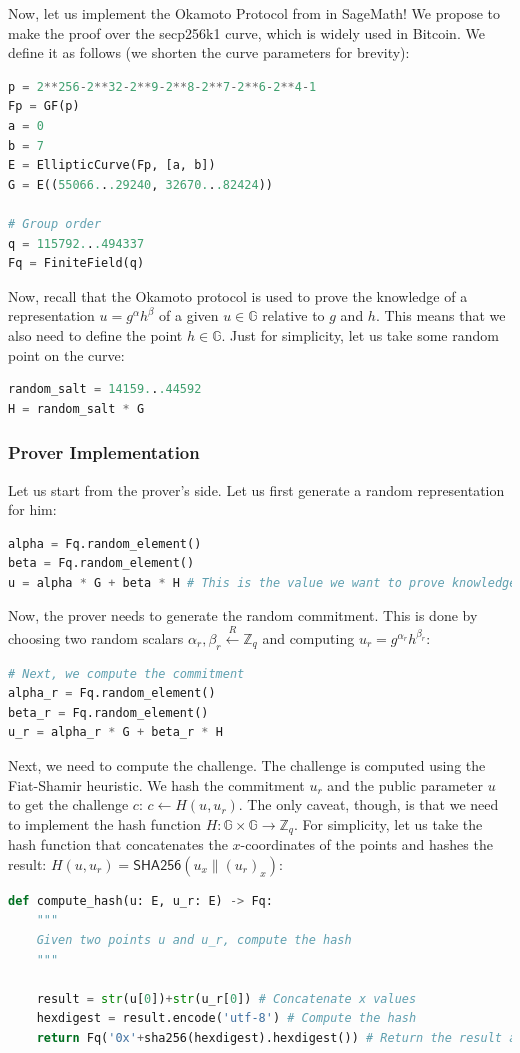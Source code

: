 \documentclass[../lecture-notes-148x210.tex]{subfiles}
\begin{document}
Now, let us implement the Okamoto Protocol from  in SageMath! We propose to make the proof 
over the secp256k1 curve, which is widely used in Bitcoin. We define it as follows (we shorten the curve parameters for brevity):
\begin{lstlisting}[language=Python]
p = 2**256-2**32-2**9-2**8-2**7-2**6-2**4-1
Fp = GF(p)
a = 0
b = 7
E = EllipticCurve(Fp, [a, b])
G = E((55066...29240, 32670...82424))

# Group order
q = 115792...494337
Fq = FiniteField(q)
\end{lstlisting}

Now, recall that the Okamoto protocol is used to prove the knowledge of a
representation $u=g^{\alpha}h^{\beta}$ of a given $u \in \mathbb{G}$ relative to
$g$ and $h$. This means that we also need to define the point $h \in \mathbb{G}$.
Just for simplicity, let us take some random point on the curve:
\begin{lstlisting}[language=Python]
random_salt = 14159...44592
H = random_salt * G
\end{lstlisting}

\subsubsection{Prover Implementation}

Let us start from the prover's side. Let us first generate a random representation for him:
\begin{lstlisting}[language=Python]
alpha = Fq.random_element()
beta = Fq.random_element()
u = alpha * G + beta * H # This is the value we want to prove knowledge of
\end{lstlisting}

Now, the prover needs to generate the random commitment. This is done by choosing
two random scalars $\alpha_r, \beta_r \xleftarrow{R} \mathbb{Z}_q$ and computing
$u_r = g^{\alpha_r}h^{\beta_r}$:
\begin{lstlisting}[language=Python]
# Next, we compute the commitment
alpha_r = Fq.random_element()
beta_r = Fq.random_element()
u_r = alpha_r * G + beta_r * H
\end{lstlisting}

Next, we need to compute the challenge. The challenge is computed using 
the Fiat-Shamir heuristic. We hash the commitment $u_r$ and the public
parameter $u$ to get the challenge $c$: $c \gets H(u,u_r)$. The only 
caveat, though, is that we need to implement the hash function 
$H: \mathbb{G} \times \mathbb{G} \to \mathbb{Z}_q$. For simplicity, let us 
take the hash function that concatenates the $x$-coordinates of the points
and hashes the result: $H(u,u_r) = \mathsf{SHA256}(u_x \parallel (u_r)_x)$:
\begin{lstlisting}[language=Python]
def compute_hash(u: E, u_r: E) -> Fq:
    """
    Given two points u and u_r, compute the hash
    """

    result = str(u[0])+str(u_r[0]) # Concatenate x values
    hexdigest = result.encode('utf-8') # Compute the hash
    return Fq('0x'+sha256(hexdigest).hexdigest()) # Return the result as an element of Fq
\end{lstlisting}
\end{document}
